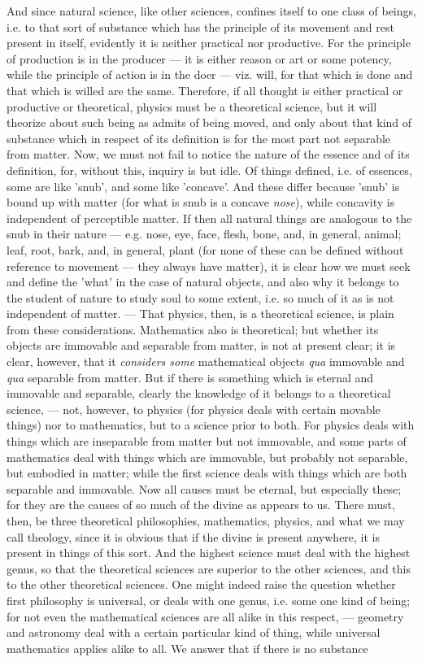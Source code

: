 And since natural science, like other sciences, confines itself to one class of beings, i.e. to that sort of substance which has the principle of its movement and rest present in itself, evidently it is neither practical nor productive. For the principle of production is in the producer — it is either reason or art or some potency, while the principle of action is in the doer — viz. will, for that which is done and that which is willed are the same. Therefore, if all thought is either practical or productive or theoretical, physics must be a theoretical science, but it will theorize about such being as admits of being moved, and only about that kind of substance which in respect of its definition is for the most part not separable from matter. Now, we must not fail to notice the nature of the essence and of its definition, for, without this, inquiry is but idle. Of things defined, i.e. of essences, some are like 'snub', and some like 'concave'. And these differ because 'snub' is bound up with matter (for what is snub is a concave \emph{nose}), while concavity is independent of perceptible matter. If then all natural things are analogous to the snub in their nature — e.g. nose, eye, face, flesh, bone, and, in general, animal; leaf, root, bark, and, in general, plant (for none of these can be defined without reference to movement — they always have matter), it is clear how we must seek and define the 'what' in the case of natural objects, and also why it belongs to the student of nature to study soul to some extent, i.e. so much of it as is not independent of matter. — That physics, then, is a theoretical science, is plain from these considerations. Mathematics also is theoretical; but whether its objects are immovable and separable from matter, is not at present clear; it is clear, however, that it \emph{considers some} mathematical objects \emph{qua} immovable and \emph{qua} separable from matter. But if there is something which is eternal and immovable and separable, clearly the knowledge of it belongs to a theoretical science, — not, however, to physics (for physics deals with certain movable things) nor to mathematics, but to a science prior to both. For physics deals with things which are inseparable from matter but not immovable, and some parts of mathematics deal with things which are immovable, but probably not separable, but embodied in matter; while the first science deals with things which are both separable and immovable. Now all causes must be eternal, but especially these; for they are the causes of so much of the divine as appears to us. There must, then, be three theoretical philosophies, mathematics, physics, and what we may call theology, since it is obvious that if the divine is present anywhere, it is present in things of this sort. And the highest science must deal with the highest genus, so that the theoretical sciences are superior to the other sciences, and this to the other theoretical sciences. One might indeed raise the question whether first philosophy is universal, or deals with one genus, i.e. some one kind of being; for not even the mathematical sciences are all alike in this respect, — geometry and astronomy deal with a certain particular kind of thing, while universal mathematics applies alike to all. We answer that if there is no substance 